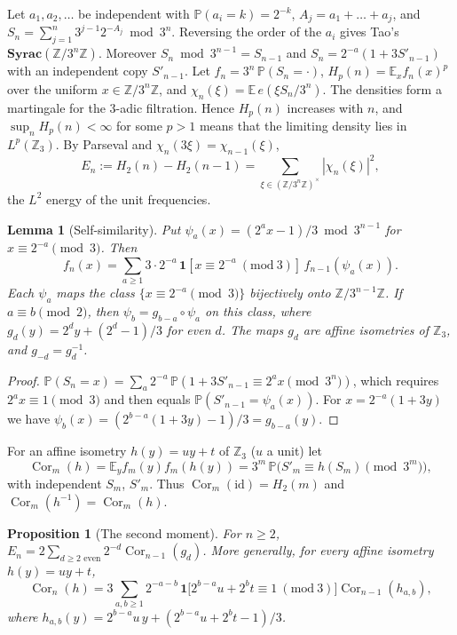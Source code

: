 \documentclass[12pt]{amsart}
\newtheorem{lemma}{Lemma}
\newtheorem{proposition}{Proposition}
\theoremstyle{definition}
\theoremstyle{remark}
\begin{document}
Let $a_1,a_2,\dots$ be independent with $\mathbb P(a_i=k)=2^{-k}$, $A_j=a_1+\dots+a_j$, and $S_n=\sum_{j=1}^n3^{j-1}2^{-A_j}\bmod3^n$. Reversing the order of the $a_i$ gives Tao's $\mathbf{Syrac}(\mathbb Z/3^n\mathbb Z)$. Moreover $S_n\bmod3^{n-1}=S_{n-1}$ and $S_n=2^{-a}(1+3S'_{n-1})$ with an independent copy $S'_{n-1}$. Let $f_n=3^n\,\mathbb P(S_n=\cdot)$, $H_p(n)=\mathbb E_xf_n(x)^p$ over the uniform $x\in\mathbb Z/3^n\mathbb Z$, and $\chi_n(\xi)=\mathbb E\,e(\xi S_n/3^n)$. The densities form a martingale for the $3$-adic filtration. Hence $H_p(n)$ increases with $n$, and $\sup_nH_p(n)<\infty$ for some $p>1$ means that the limiting density lies in $L^p(\mathbb Z_3)$. By Parseval and $\chi_n(3\xi)=\chi_{n-1}(\xi)$,
\[
 E_n:=H_2(n)-H_2(n-1)=\sum_{\xi\in(\mathbb Z/3^n\mathbb Z)^\times}|\chi_n(\xi)|^2 ,
\]
the $L^2$ energy of the unit frequencies.

\begin{lemma}[Self-similarity]
\label{lem:selfsim}
Put $\psi_a(x)=(2^ax-1)/3\bmod3^{n-1}$ for $x\equiv2^{-a}\pmod3$. Then
\[
 f_n(x)=\sum_{a\ge1}3\cdot2^{-a}\,\mathbf 1[x\equiv2^{-a}\ (\mathrm{mod}\ 3)]\,f_{n-1}(\psi_a(x)).
\]
Each $\psi_a$ maps the class $\{x\equiv2^{-a}\pmod3\}$ bijectively onto $\mathbb Z/3^{n-1}\mathbb Z$. If $a\equiv b\pmod2$, then $\psi_b=g_{b-a}\circ\psi_a$ on this class, where $g_d(y)=2^dy+(2^d-1)/3$ for even $d$. The maps $g_d$ are affine isometries of $\mathbb Z_3$, and $g_{-d}=g_d^{-1}$.
\end{lemma}

\begin{proof}
$\mathbb P(S_n=x)=\sum_a2^{-a}\,\mathbb P(1+3S'_{n-1}\equiv2^ax\pmod{3^n})$, which requires $2^ax\equiv1\pmod3$ and then equals $\mathbb P(S'_{n-1}=\psi_a(x))$. For $x=2^{-a}(1+3y)$ we have $\psi_b(x)=(2^{b-a}(1+3y)-1)/3=g_{b-a}(y)$.
\end{proof}

For an affine isometry $h(y)=uy+t$ of $\mathbb Z_3$ ($u$ a unit) let
\[
 \operatorname{Cor}_m(h)=\mathbb E_yf_m(y)f_m(h(y))=3^m\,\mathbb P\bigl(S'_m\equiv h(S_m)\pmod{3^m}\bigr),
\]
with independent $S_m$, $S'_m$. Thus $\operatorname{Cor}_m(\mathrm{id})=H_2(m)$ and $\operatorname{Cor}_m(h^{-1})=\operatorname{Cor}_m(h)$.

\begin{proposition}[The second moment]
\label{prop:energy}
For $n\ge2$, $E_n=2\sum_{d\ge2\text{ even}}2^{-d}\operatorname{Cor}_{n-1}(g_d)$. More generally, for every affine isometry $h(y)=uy+t$,
\[
 \operatorname{Cor}_n(h)=3\sum_{a,b\ge1}2^{-a-b}\,\mathbf 1\bigl[2^{b-a}u+2^bt\equiv1\ (\mathrm{mod}\ 3)\bigr]\operatorname{Cor}_{n-1}(h_{a,b}),
\]
where $h_{a,b}(y)=2^{b-a}u\,y+(2^{b-a}u+2^bt-1)/3$.
\end{proposition}
\end{document}

